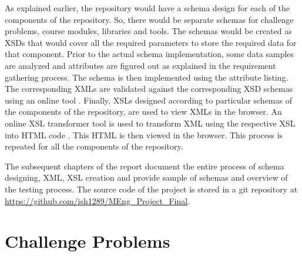 \documentclass[11pt,letterpaper]{report}
\begin{document}
As explained earlier, the repository would have a schema design for each of the components of the repository. So, there would be separate schemas for challenge problems, course modules, libraries and tools. The schemas would be created as XSDs that would cover all the required parameters to store the required data for that component. Prior to the actual schema implementation, some data samples are analyzed and attributes are figured out as explained in the requirement gathering process. The schema is then implemented using the attribute listing. The corresponding XMLs are validated against the corresponding XSD schemas using an online tool \cite{olXSD}. Finally, XSLs designed according to particular schemas of the components of the repository, are used to view XMLs in the browser. An online XSL transformer tool is used to transform XML using the respective XSL into HTML code \cite{olXSL}. This HTML is then viewed in the browser. This process is repeated for all the components of the repository. 

The subsequent chapters of the report document the entire process of schema designing, XML, XSL creation and provide sample of schemas and overview of the testing process. The source code of the project is stored in a git repository at \url{https://github.com/ish1289/MEng_Project_Final}.

\chapter{Challenge Problems}
\label{chap:CP}
\end{document}
